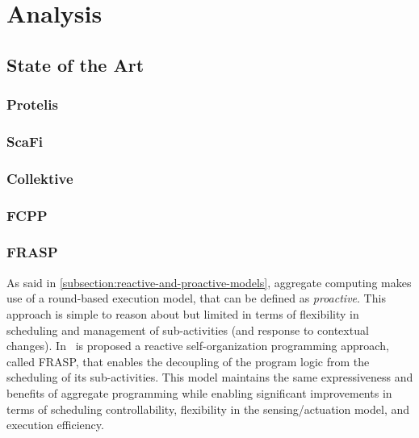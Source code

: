 
\chapter{Analysis}
\label{chap:analysis}
\section{State of the Art}

\subsection{Protelis}

\subsection{ScaFi}

\subsection{Collektive}

\subsection{FCPP}

\subsection{FRASP}

As said in \cref{subsection:reactive-and-proactive-models}, aggregate computing makes use of a round-based execution model, that can be defined as \textit{proactive}. This approach is simple to reason about but limited in terms of flexibility in scheduling and management of sub-activities (and response to contextual changes). In~\cite{Casadei2023} is proposed a reactive self-organization programming approach, called FRASP, that enables the decoupling of the program logic from the scheduling of its sub-activities. This model maintains the same expressiveness and benefits of aggregate programming while enabling significant improvements in terms of scheduling controllability, flexibility in the sensing/actuation model, and execution efficiency.

